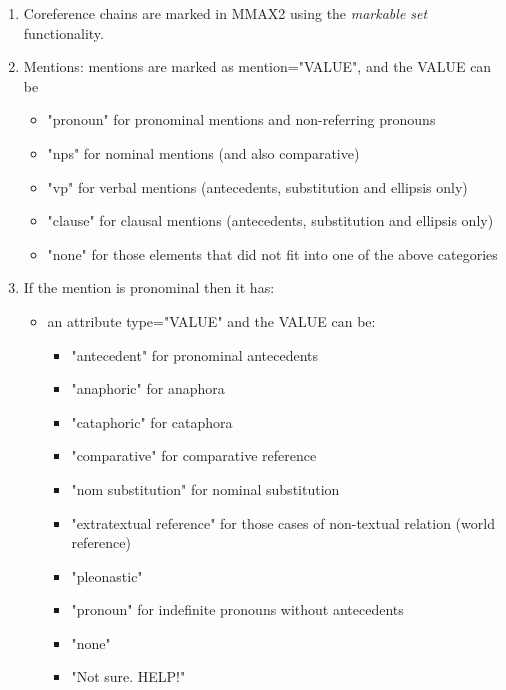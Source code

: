 \documentclass[a4paper]{article}
\begin{document}
\begin{enumerate}

\item Coreference chains are marked in MMAX2 using the \emph{markable set}
functionality.

\item Mentions: mentions are marked as mention="VALUE", and the VALUE can be 
\begin{itemize}
\item "pronoun" for pronominal mentions and non-referring pronouns
\item "nps" for nominal mentions (and also comparative)
\item "vp" for verbal mentions (antecedents, substitution and ellipsis  only)
\item "clause" for clausal mentions (antecedents, substitution and ellipsis  only)
\item "none" for those elements that did not fit into one of the above categories 
\end{itemize}

\item If the mention is pronominal then it has:
\begin{itemize}
\item  an attribute type="VALUE" and the VALUE can be:
\begin{itemize}
\item "antecedent" for pronominal antecedents 
\item "anaphoric" for anaphora
\item "cataphoric" for cataphora
\item "comparative" for comparative reference
\item "nom substitution" for nominal substitution
\item "extratextual reference" for those cases of non-textual relation (world reference)
\item "pleonastic"
\item "pronoun" for indefinite pronouns without antecedents
\item "none"
 \item "Not sure. HELP!"
 \end{itemize}
 

\end{itemize}
\end{enumerate}
\end{document}
